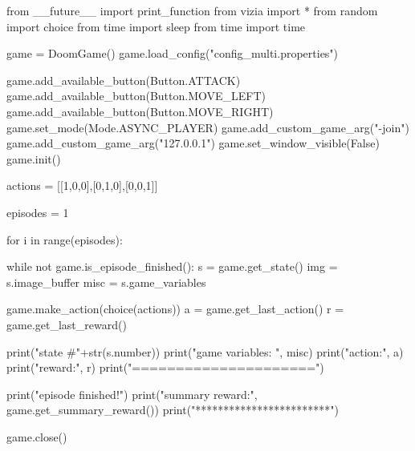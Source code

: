 \begin{pblock}
from __future__ import print_function
from vizia import *
from random import choice
from time import sleep
from time import time



game = DoomGame()
game.load_config("config_multi.properties")

game.add_available_button(Button.ATTACK)
game.add_available_button(Button.MOVE_LEFT)
game.add_available_button(Button.MOVE_RIGHT)
game.set_mode(Mode.ASYNC_PLAYER)
game.add_custom_game_arg("-join")
game.add_custom_game_arg("127.0.0.1")
game.set_window_visible(False)
game.init()


actions = [[1,0,0],[0,1,0],[0,0,1]]

episodes = 1

for i in range(episodes):
	
	while not game.is_episode_finished():	
		s = game.get_state()
		img = s.image_buffer
		misc = s.game_variables

		game.make_action(choice(actions))
		a = game.get_last_action()
		r = game.get_last_reward()
			
		print("state #"+str(s.number))
		print("game variables: ", misc)
		print("action:", a)
		print("reward:", r)
		print("=====================")
	
	print("episode finished!")
	print("summary reward:", game.get_summary_reward())
	print("************************")

game.close()
\end{pblock}

